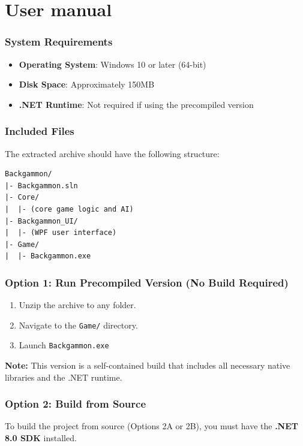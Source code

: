 \chapter{User manual}
\subsection*{System Requirements}
\begin{itemize}
    \item \textbf{Operating System}: Windows 10 or later (64-bit)
    \item \textbf{Disk Space}: Approximately 150MB
    \item \textbf{.NET Runtime}: Not required if using the precompiled version
\end{itemize}

\subsection*{Included Files}

The extracted archive should have the following structure:

\begin{verbatim}
Backgammon/
|- Backgammon.sln
|- Core/
|  |- (core game logic and AI)
|- Backgammon_UI/
|  |- (WPF user interface)
|- Game/
|  |- Backgammon.exe
\end{verbatim}

\subsection*{Option 1: Run Precompiled Version (No Build Required)}

\begin{enumerate}
    \item Unzip the archive to any folder.
    \item Navigate to the \texttt{Game/} directory.
    \item Launch \verb|Backgammon.exe|
\end{enumerate}

\noindent
\textbf{Note:} This version is a self-contained build that includes all necessary native libraries and the .NET runtime.

\vspace{1em}

\subsection*{Option 2: Build from Source}
To build the project from source (Options 2A or 2B), you must have the \textbf{.NET 8.0 SDK} installed.

